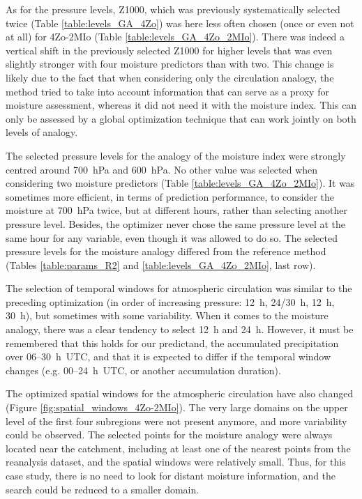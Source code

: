 \documentclass[review]{elsarticle}
\begin{document}
As for the pressure levels, Z1000, which was previously systematically selected twice (Table \ref{table:levels_GA_4Zo}) was here less often chosen (once or even not at all) for 4Zo-2MIo (Table \ref{table:levels_GA_4Zo_2MIo}). There was indeed a vertical shift in the previously selected Z1000 for higher levels that was even slightly stronger with four moisture predictors than with two. This change is likely due to the fact that when considering only the circulation analogy, the method tried to take into account information that can serve as a proxy for moisture assessment, whereas it did not need it with the moisture index. This can only be assessed by a global optimization technique that can work jointly on both levels of analogy. 

The selected pressure levels for the analogy of the moisture index were strongly centred around 700~hPa and 600~hPa. No other value was selected when considering two moisture predictors (Table \ref{table:levels_GA_4Zo_2MIo}). It was sometimes more efficient, in terms of prediction performance, to consider the moisture at 700~hPa twice, but at different hours, rather than selecting another pressure level. Besides, the optimizer never chose the same pressure level at the same hour for any variable, even though it was allowed to do so. The selected pressure levels for the moisture analogy differed from the reference method (Tables \ref{table:params_R2} and \ref{table:levels_GA_4Zo_2MIo}, last row).

The selection of temporal windows for atmospheric circulation was similar to the preceding optimization (in order of increasing pressure: 12~h, 24/30~h, 12~h, 30~h), but sometimes with some variability. When it comes to the moisture analogy, there was a clear tendency to select 12~h and 24~h. However, it must be remembered that this holds for our predictand, the accumulated precipitation over 06--30~h~UTC, and that it is expected to differ if the temporal window changes (e.g. 00--24~h~UTC, or another accumulation duration).

The optimized spatial windows for the atmospheric circulation have also changed (Figure \ref{fig:spatial_windows_4Zo-2MIo}). The very large domains on the upper level of the first four subregions were not present anymore, and more variability could be observed. The selected points for the moisture analogy were always located near the catchment, including at least one of the nearest points from the reanalysis dataset, and the spatial windows were relatively small. Thus, for this case study, there is no need to look for distant moisture information, and the search could be reduced to a smaller domain. 
\end{document}
